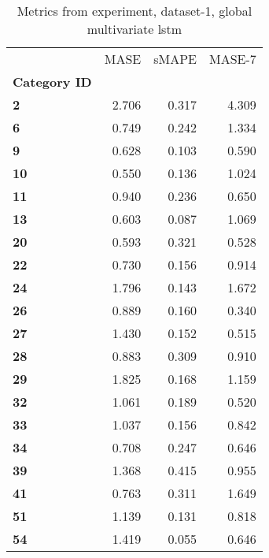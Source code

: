 \begin{table}[h]
\centering
\caption{Metrics from experiment, dataset-1, global multivariate lstm}
\label{table:global-multivariate-lstm-dataset-1}
\begin{tabular}{lrrr}
\toprule
{} &   MASE &  sMAPE &  MASE-7 \\
\textbf{Category ID} &        &        &         \\
\midrule
\textbf{2          } &  2.706 &  0.317 &   4.309 \\
\textbf{6          } &  0.749 &  0.242 &   1.334 \\
\textbf{9          } &  0.628 &  0.103 &   0.590 \\
\textbf{10         } &  0.550 &  0.136 &   1.024 \\
\textbf{11         } &  0.940 &  0.236 &   0.650 \\
\textbf{13         } &  0.603 &  0.087 &   1.069 \\
\textbf{20         } &  0.593 &  0.321 &   0.528 \\
\textbf{22         } &  0.730 &  0.156 &   0.914 \\
\textbf{24         } &  1.796 &  0.143 &   1.672 \\
\textbf{26         } &  0.889 &  0.160 &   0.340 \\
\textbf{27         } &  1.430 &  0.152 &   0.515 \\
\textbf{28         } &  0.883 &  0.309 &   0.910 \\
\textbf{29         } &  1.825 &  0.168 &   1.159 \\
\textbf{32         } &  1.061 &  0.189 &   0.520 \\
\textbf{33         } &  1.037 &  0.156 &   0.842 \\
\textbf{34         } &  0.708 &  0.247 &   0.646 \\
\textbf{39         } &  1.368 &  0.415 &   0.955 \\
\textbf{41         } &  0.763 &  0.311 &   1.649 \\
\textbf{51         } &  1.139 &  0.131 &   0.818 \\
\textbf{54         } &  1.419 &  0.055 &   0.646 \\
\bottomrule
\end{tabular}
\end{table}
